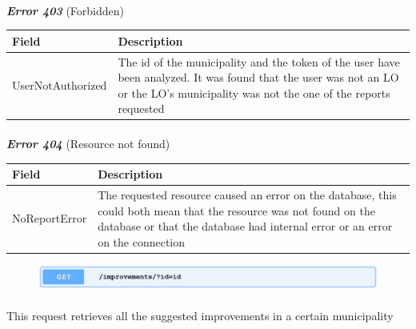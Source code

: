 						\paragraph{}
						\vspace{-5mm}
							\textcolor{myRed}{\textit{\textbf{Error 403}}} (Forbidden)
							\vspace{-2mm}
							\begin{table}[!h]
								\begin{tabular}{L{0.3\textwidth}L{0.62\textwidth}}
									\toprule
									\textbf{Field} & \textbf{Description} \\
									\midrule
								  	UserNotAuthorized & The id of the municipality and the token of the user have been analyzed. It was found that the user was not an LO or the LO's  municipality was not the one of the reports requested  \\
								 	\bottomrule
								\end{tabular}
							\end{table}
						\vspace{-5mm}
						\paragraph{}
							\textcolor{myRed}{\textit{\textbf{Error 404}}} (Resource not found)
							\vspace{-2mm}
							\begin{table}[!h]
								\begin{tabular}{L{0.25\textwidth}L{0.67\textwidth}}
									\toprule
									\textbf{Field} & \textbf{Description} \\
									\midrule
								  	 NoReportError & The requested resource caused an error on the database, this could both mean that the resource was not found on the database or that the database had internal error or an error on the connection \\ 
								 	\bottomrule
								\end{tabular}
							\end{table}
						
						\clearpage
						\begin{figure}[!h]
							\includegraphics[width=\textwidth]{images/Restful/GetImprovements}
						\end{figure}
						\paragraph{}
						\vspace{-7.5mm}
						This request retrieves all the suggested improvements in a certain municipality

